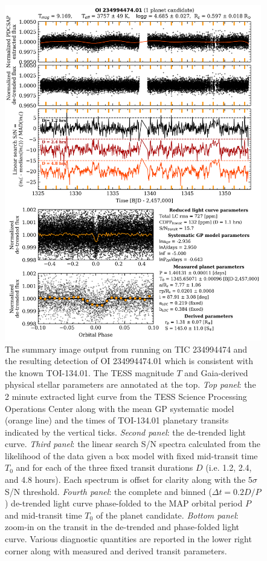 \begin{figure}
  \centering
  \includegraphics[width=0.8\hsize]{figures/planetcandidatesummary_1_234994474.png}
  \caption[Summary output for TIC 234994474 from \texttt{ORION}.]
      {The summary image output from running \pipeline{} on TIC 234994474 and the resulting
    detection of OI 234994474.01 which is consistent with the known TOI-134.01. The TESS
    magnitude $T$ and Gaia-derived physical stellar parameters 
    are annotated at the top. \emph{Top panel}: the 2 minute extracted light curve from
    the TESS Science Processing Operations Center along with the mean GP systematic model
    (orange line) and the
    times of TOI-134.01 planetary transits indicated by the vertical ticks. \emph{Second panel}: the
    de-trended light curve. \emph{Third panel}: the linear search S/N spectra calculated
    from the likelihood of the data given a box model with fixed mid-transit time $T_0$ and for
    each of the three fixed transit durations $D$ (i.e. 1.2, 2.4, and 4.8 hours).
    Each spectrum is offset for clarity along with the $5\sigma$ S/N threshold.
    \emph{Fourth panel}: the complete and binned ($\Delta t = 0.2D/P$) de-trended light curve
    phase-folded to the MAP orbital period $P$ and mid-transit time $T_0$ of the planet candidate.
    \emph{Bottom panel}: zoom-in on the transit in the de-trended and phase-folded light curve.
    Various diagnostic quantities are reported in the lower right corner along with measured
    and derived transit parameters.}
  \label{fig:summary}
\end{figure}


